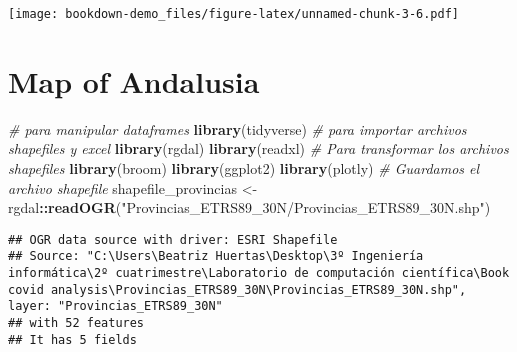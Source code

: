 \documentclass[
]{book}
\newenvironment{Shaded}{\begin{snugshade}}{\end{snugshade}}
\newcommand{\CommentTok}[1]{\textcolor[rgb]{0.56,0.35,0.01}{\textit{#1}}}
\newcommand{\DataTypeTok}[1]{\textcolor[rgb]{0.13,0.29,0.53}{#1}}
\newcommand{\DecValTok}[1]{\textcolor[rgb]{0.00,0.00,0.81}{#1}}
\newcommand{\KeywordTok}[1]{\textcolor[rgb]{0.13,0.29,0.53}{\textbf{#1}}}
\newcommand{\NormalTok}[1]{#1}
\newcommand{\OperatorTok}[1]{\textcolor[rgb]{0.81,0.36,0.00}{\textbf{#1}}}
\newcommand{\StringTok}[1]{\textcolor[rgb]{0.31,0.60,0.02}{#1}}
\begin{document}
\begin{Shaded}
\end{Shaded}

\texttt{[image: bookdown-demo\_files/figure-latex/unnamed-chunk-3-6.pdf]}

\hypertarget{map-of-andalusia}{%
\section{Map of Andalusia}\label{map-of-andalusia}}

\begin{Shaded}
\begin{Highlighting}[]
\CommentTok{\# para manipular dataframes}
\KeywordTok{library}\NormalTok{(tidyverse)}
\CommentTok{\# para importar archivos shapefiles y excel}
\KeywordTok{library}\NormalTok{(rgdal)}
\KeywordTok{library}\NormalTok{(readxl)}
\CommentTok{\# Para transformar los archivos shapefiles }
\KeywordTok{library}\NormalTok{(broom)}
\KeywordTok{library}\NormalTok{(ggplot2)}
\KeywordTok{library}\NormalTok{(plotly)}
\CommentTok{\# Guardamos el archivo shapefile}
\NormalTok{shapefile\_provincias \textless{}{-}}\StringTok{ }\NormalTok{rgdal}\OperatorTok{::}\KeywordTok{readOGR}\NormalTok{(}\StringTok{"Provincias\_ETRS89\_30N/Provincias\_ETRS89\_30N.shp"}\NormalTok{)}
\end{Highlighting}
\end{Shaded}

\begin{verbatim}
## OGR data source with driver: ESRI Shapefile 
## Source: "C:\Users\Beatriz Huertas\Desktop\3º Ingeniería informática\2º cuatrimestre\Laboratorio de computación científica\Book covid analysis\Provincias_ETRS89_30N\Provincias_ETRS89_30N.shp", layer: "Provincias_ETRS89_30N"
## with 52 features
## It has 5 fields
\end{verbatim}
\end{document}
